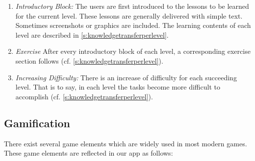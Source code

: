\begin{enumerate}
\begin{enumerate}
	\item \textit{Introductory Block:} 
The users are first introduced to the lessons to be learned for the current level.
These lessons are generally delivered with simple text.
Sometimes screenshots or graphics are included.
 The learning contents of each level are described in \autoref{s:knowledgetransferperlevel}.
		\item \textit{Exercise} After every introductory block of each level, a corresponding exercise section follows (cf. \autoref{s:knowledgetransferperlevel}).
		\item \textit{Increasing Difficulty:} There is an increase of difficulty for each succeeding level.
 That is to say, in each level the tasks become more difficult to accomplish (cf. \autoref{s:knowledgetransferperlevel}).
\end{enumerate}
\end{enumerate}


\subsection{Gamification}
There exist several game elements which are widely used in most modern games.
These game elements are reflected in our app as follows:

